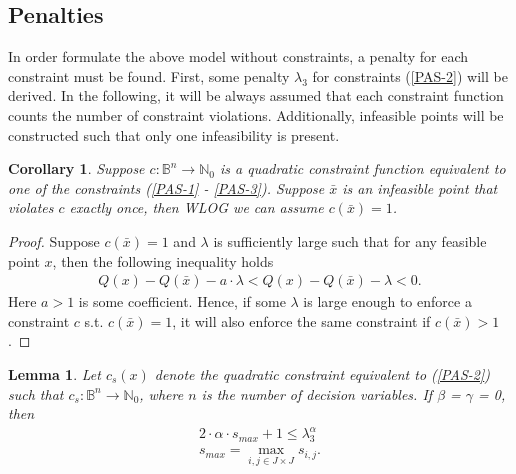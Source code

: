 \documentclass[12pt]{article}
\newtheorem{corollary}{Corollary}[theorem]
\newtheorem{lemma}[theorem]{Lemma}
\begin{document}
\subsection{Penalties}
In order formulate the above model without constraints, a penalty for each constraint must be found.
First, some penalty $\lambda_3$ for constraints (\ref{PAS-2}) will be derived.
In the following, it will be always assumed that each constraint function counts the number of constraint violations.
Additionally, infeasible points will be constructed such that only one infeasibility is present.
\begin{corollary}
Suppose $c: \mathbb{B}^n \rightarrow \mathbb{N}_0$ is a quadratic constraint function equivalent to one of the constraints (\ref{PAS-1} - \ref{PAS-3}).
Suppose $\bar{x}$ is an infeasible point that violates $c$ exactly once, then WLOG we can assume $c(\bar{x}) = 1$.
\end{corollary}
\begin{proof}
Suppose $c(\bar{x}) = 1$ and  $\lambda$ is sufficiently large such that for any feasible point $x$, then the following inequality holds
\begin{gather*}
Q(x) - Q(\bar{x}) - a \cdot \lambda < Q(x) - Q(\bar{x}) - \lambda  < 0.
\end{gather*}
Here $a>1$ is some coefficient.
Hence, if some $\lambda$ is large enough to enforce a constraint $c$ s.t. $c(\bar{x}) = 1$, it will also enforce the same constraint if $c(\bar{x}) > 1$. 
\end{proof}
\begin{lemma}\label{LMA-PAS-ST}
Let $c_s(x)$ denote the quadratic constraint equivalent to (\ref{PAS-2}) such that $c_s : \mathbb{B}^n \rightarrow \mathbb{N}_0$, where $n$ is the number of decision variables.
If $\beta$ = $\gamma$ = 0, then 
\begin{gather}
2 \cdot \alpha\cdot s_{max} + 1 \leq \lambda_3^{\alpha} \\
s_{max} = \max_{i, j \in J \times J} s_{i, j}.
\end{gather}
\end{lemma}
\end{document}
